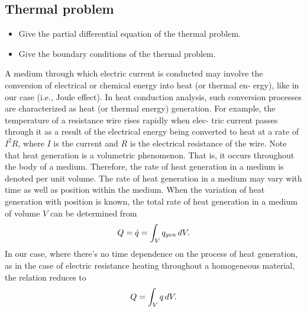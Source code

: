 \subsection{Thermal problem}
\begin{itemize}
	\item Give the partial differential equation of the thermal problem.
	\item Give the boundary conditions of the thermal problem.
\end{itemize}
A medium through which electric current is conducted may involve the conversion of electrical or chemical energy into heat (or thermal en-
ergy), like in our case (i.e., Joule effect). In heat conduction analysis, such conversion processes are characterized as heat (or thermal energy) generation.
For example, the temperature of a resistance wire rises rapidly when elec-
tric current passes through it as a result of the electrical energy being converted to heat at a rate of $ I^2R $, where $ I $ is the current and $ R $ is the electrical resistance of the wire. 
Note  that  heat  generation  is  a  volumetric  phenomenon. That  is, it  occurs throughout the body of a medium. Therefore, the rate of heat generation in a medium is denoted per unit volume. The rate of heat generation in a medium may vary with time as well as position within the medium. When the variation of heat generation with position
is known, the 
total
rate of heat generation in a medium of volume $ V $ can be determined from
\[Q = \dot{q}=\int_V q_{gen}\mathop{}\!d V. \]
In  our case, where there's no time dependence on the process of heat  generation,  as  in  the  case  of  electric
resistance heating throughout a homogeneous material, the relation reduces to 
\[Q = \int_{V}q\mathop{}\!d V. \]
